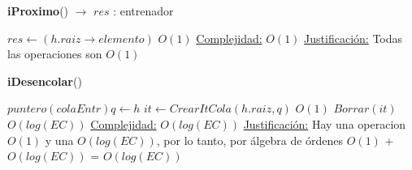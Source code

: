 \begin{Algoritmos}
\begin{algorithm}[H]{\textbf{iProximo}() $\to$ $res$ : entrenador}
    	\begin{algorithmic}[1]
    		 \State $res \gets (h.raiz \rightarrow elemento)$ \Comment $O(1)$
    		 \medskip
			\Statex \underline{Complejidad:} $O(1)$
			\Statex \underline{Justificaci\'on:} Todas las operaciones son $O(1)$ 
    	\end{algorithmic}
\end{algorithm}

\begin{algorithm}[H]{\textbf{iDesencolar}()}
    	\begin{algorithmic}[1]
			 \State $puntero(colaEntr) q \gets h$    		 
    		 \State $it \gets CrearItCola(h.raiz, q)$ \Comment $O(1)$
    		 \State $Borrar(it)$ \Comment $O(log(EC))$
    		 \medskip
			\Statex \underline{Complejidad:} $O(log(EC))$
			\Statex \underline{Justificaci\'on:} Hay una operacion $O(1)$ y una $O(log(EC))$, por lo tanto, por \'algebra de \'ordenes $O(1)$ + $O(log(EC))$ = $O(log(EC))$
    	\end{algorithmic}
\end{algorithm}

\end{Algoritmos}

